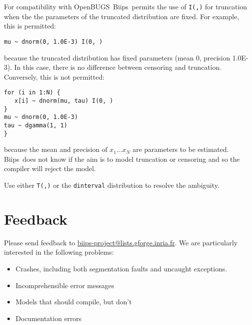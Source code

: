 \documentclass[11pt, a4paper, titlepage]{report}
\makeatletter
\newcommand{\biips}{\textsf{Biips}}
\newcommand{\email}{\url{biips-project@lists.gforge.inria.fr}}
\newcommand{\OpenBUGS}{\textsf{OpenBUGS}}
\makeatother
\begin{document}
For compatibility with \OpenBUGS\, \biips\ permits the use of \texttt{I(,)}
for truncation when the the parameters of the truncated distribution
are fixed.  For example, this is permitted:
\begin{verbatim}
mu ~ dnorm(0, 1.0E-3) I(0, )
\end{verbatim}
because the truncated distribution has fixed parameters (mean 0,
precision 1.0E-3).  In this case, there is no difference between 
censoring and truncation.  Conversely, this is not permitted:
\begin{verbatim}
for (i in 1:N) {
   x[i] ~ dnorm(mu, tau) I(0, )
}
mu ~ dnorm(0, 1.0E-3)
tau ~ dgamma(1, 1)
}
\end{verbatim}
because the mean and precision of $x_1 \dots x_N$ are parameters to be
estimated.  \biips\ does not know if the aim is to model truncation or censoring
and so the compiler will reject the model.

Use either \texttt{T(,)} or the \texttt{dinterval} distribution to resolve the ambiguity.

% 

\chapter{Feedback}

Please send feedback to \email{}.
We are particularly interested in the following problems:

\begin{itemize}
\item Crashes, including both segmentation faults and uncaught exceptions.
\item Incomprehensible error messages
\item Models that should compile, but don't 
\item Documentation errors
\end{itemize}
\end{document}
